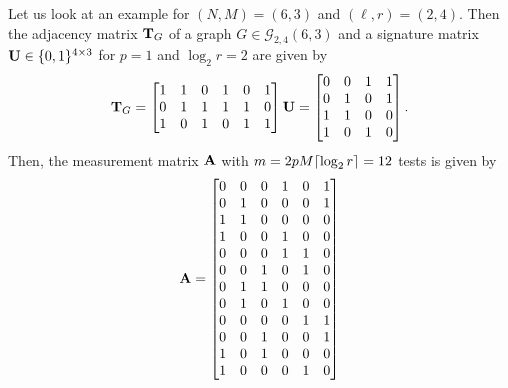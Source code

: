 \begin{example}\label{exmp:tensor}
Let us look at an example for $(N,M)=(6,3)$ and $(\ell,r)=(2,4)$. Then the adjacency matrix $\mathbf{T}_G$ of a graph $G\in\mathcal{G}_{2,4}(6,3)$ and a signature matrix $\mathbf{U}\in \{0,1\}^{4\times 3}$ for $p=1$ and $\log_2 r = 2$ are given by
 \[
 \mathbf{T}_G = \begin{bmatrix}
1 & 1 & 0 & 1 & 0 & 1    \\
0 & 1 & 1 & 1& 1 & 0 \\
1 & 0 & 1 & 0 & 1 & 1
\end{bmatrix}
\mathbf{U} = \begin{bmatrix}
0 & 0 & 1  & 1\\
0 & 1 & 0  & 1\\
1 & 1 & 0  & 0\\
1 & 0 & 1  & 0
\end{bmatrix}.
 \] 
Then, the measurement matrix $\bf A	$ with $m = 2pM\lceil{\log_2 r}\rceil=12$ tests is given by
\[ \mathbf{A} = \begin{bmatrix}
0 & 0 & 0 & 1 & 0 & 1\\
0 & 1 & 0 & 0 & 0 & 1\\
1 & 1 & 0 & 0 & 0 & 0\\
1 & 0 & 0 & 1 & 0 & 0\\
0 & 0 & 0 & 1& 1 & 0 \\
0 & 0 & 1 & 0& 1 & 0 \\
0 & 1 & 1 & 0& 0 & 0 \\
0 & 1 & 0 & 1& 0 & 0 \\
0 & 0 & 0 & 0 & 1 & 1\\
0 & 0 & 1 & 0 & 0 & 1\\
1 & 0 & 1 & 0 & 0 & 0\\
1 & 0 & 0 & 0 & 1 & 0\\
\end{bmatrix}
 \]
 \end{example}


